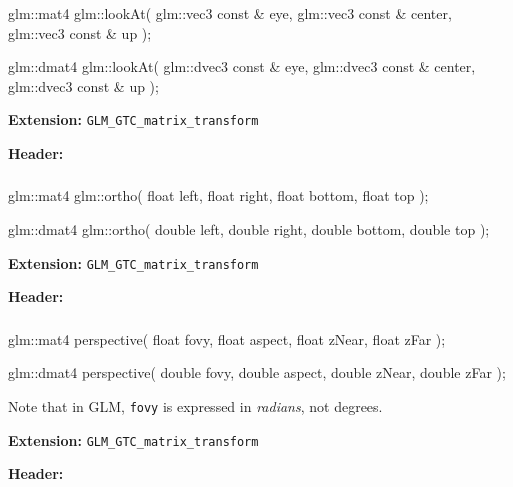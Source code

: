 \documentclass{scrartcl}
\numberwithin{figure}{subsection}
\begin{document}
\subsubsection{}

\begin{cppcode}
glm::mat4 glm::lookAt(
  glm::vec3 const & eye,
  glm::vec3 const & center,
  glm::vec3 const & up
);

glm::dmat4 glm::lookAt(
  glm::dvec3 const & eye,
  glm::dvec3 const & center,
  glm::dvec3 const & up
);
\end{cppcode}

\textbf{Extension:} \verb|GLM_GTC_matrix_transform|

\textbf{Header:} 
 
\subsubsection{}

\begin{cppcode}
glm::mat4 glm::ortho(
  float left, float right, float bottom, float top
);
  
glm::dmat4 glm::ortho(
  double left, double right, double bottom, double top
);
\end{cppcode}

\textbf{Extension:} \verb|GLM_GTC_matrix_transform|

\textbf{Header:} 

\subsubsection{}

\begin{cppcode}
glm::mat4 perspective(
  float fovy, float aspect, float zNear, float zFar
);

glm::dmat4 perspective(
  double fovy, double aspect, double zNear, double zFar
);
\end{cppcode}

Note that in GLM, \verb|fovy| is expressed in \emph{radians}, not degrees.

\textbf{Extension:} \verb|GLM_GTC_matrix_transform|

\textbf{Header:} 

\subsubsection{}
\end{document}

